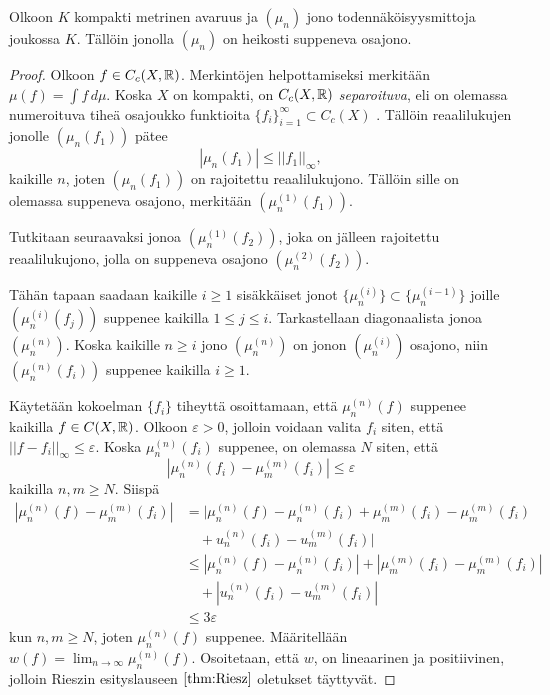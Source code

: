 \documentclass[12pt,oneside,a4paper]{amsbook} %
\begin{document}
\begin{theorem}\label{thm:probmeasureconvergence}
    Olkoon $K$ kompakti metrinen avaruus ja $(\mu_n)$ jono todennäköisyysmittoja joukossa $K$. Tällöin jonolla $(\mu_n)$ on heikosti suppeneva osajono.
\end{theorem}
\begin{proof}
    Olkoon $f \in C_c(X, \mathbb{R})$. Merkintöjen helpottamiseksi merkitään $\mu(f) = \int f \, d\mu$. Koska $X$ on kompakti, on $C_c(X, \mathbb{R})$ \textit{separoituva}, eli on olemassa numeroituva tiheä osajoukko funktioita $\{f_i\}_{i = 1}^\infty \subset C_c(X)$ \cite[s. 140]{conway}. Tällöin reaalilukujen jonolle $(\mu_n(f_1))$ pätee
    \begin{equation}
        |\mu_n(f_1)| \le ||f_1||_\infty,
    \end{equation}
    kaikille $n$, joten $(\mu_n(f_1))$ on rajoitettu reaalilukujono. Tällöin sille on olemassa suppeneva osajono, merkitään $(\mu_n^{(1)}(f_1))$.
    
    Tutkitaan seuraavaksi jonoa $(\mu_n^{(1)}(f_2))$, joka on jälleen rajoitettu reaalilukujono, jolla on suppeneva osajono $(\mu_n^{(2)}(f_2))$.
    
    Tähän tapaan saadaan kaikille $i \ge 1$ sisäkkäiset jonot $\{\mu_n^{(i)}\} \subset \{\mu_n^{(i-1)}\}$ joille $(\mu_n^{(i)}(f_j))$ suppenee kaikilla $1 \le j \le i$. Tarkastellaan diagonaalista jonoa $(\mu_n^{(n)})$. Koska kaikille $n \ge i$ jono $(\mu_n^{(n)})$ on jonon $(\mu_n^{(i)})$ osajono, niin $(\mu_n^{(n)}(f_i))$ suppenee kaikilla $i \ge 1$.
    
    Käytetään kokoelman $\{f_i\}$ tiheyttä osoittamaan, että $\mu_n^{(n)}(f)$ suppenee kaikilla $f \in C(X, \mathbb{R})$. Olkoon $\varepsilon > 0$, jolloin voidaan valita $f_i$ siten, että $||f-f_i||_\infty \le \varepsilon.$ Koska $\mu_n^{(n)}(f_i)$ suppenee, on olemassa $N$ siten, että 
    \begin{equation*}
        |\mu_n^{(n)}(f_i) - \mu_m^{(m)}(f_i)|\le \varepsilon
    \end{equation*}
    kaikilla $n, m \ge N$. Siispä
    \begin{align*}
        |\mu_n^{(n)}(f) - \mu_m^{(m)}(f_i)| &=  |\mu_n^{(n)}(f) - \mu_n^{(n)}(f_i) + \mu_m^{(m)}(f_i) - \mu_m^{(m)}(f_i) \\ &\quad  + u_n^{(n)}(f_i) - u_m^{(m)}(f_i) | \\
        &\le |\mu_n^{(n)}(f) - \mu_n^{(n)}(f_i)| + |\mu_m^{(m)}(f_i) - \mu_m^{(m)}(f_i)| \\ &\quad  + |u_n^{(n)}(f_i) - u_m^{(m)}(f_i) | \\
        &\le 3\varepsilon
    \end{align*}
    kun $n, m \ge N$, joten $\mu_n^{(n)}(f)$ suppenee. Määritellään $w(f) = \lim_{n \to \infty} \mu_n^{(n)}(f)$. Osoitetaan, että $w$, on lineaarinen ja positiivinen, jolloin Rieszin esityslauseen $\ref{thm:Riesz}$ oletukset täyttyvät. 
    

\end{proof}
\end{document}
